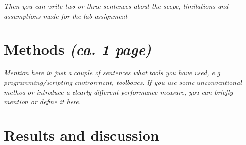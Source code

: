 \documentclass[a4paper]{article}
\begin{document}
\textit{Then you can write two or three sentences about the scope, limitations and assumptions made for the lab assignment}\\

\section{Methods \normalsize{\textit{(ca. 1 page)}}}
\textit{Mention here in just a couple of sentences what tools you have used, e.g. programming/scripting environment, toolboxes. If you use some unconventional method or introduce a clearly different performance measure, you can briefly mention or define it here.}\\

\section{Results and discussion}
\end{document}
